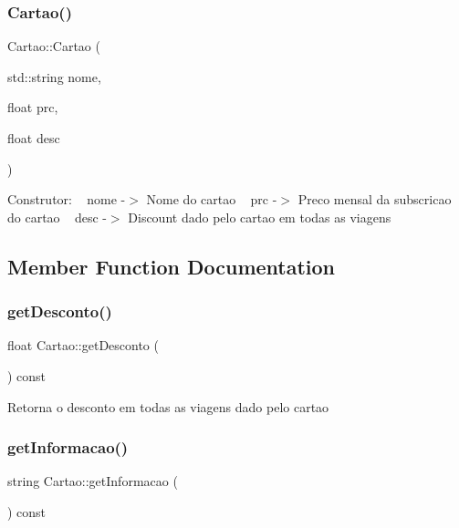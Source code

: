 \subsubsection{\texorpdfstring{Cartao()}{Cartao()}}
{\footnotesize\ttfamily Cartao\+::\+Cartao (\begin{DoxyParamCaption}\item[{std\+::string}]{nome,  }\item[{float}]{prc,  }\item[{float}]{desc }\end{DoxyParamCaption})}

Construtor\+: ~\newline
nome -\/$>$ Nome do cartao ~\newline
prc -\/$>$ Preco mensal da subscricao do cartao ~\newline
desc -\/$>$ Discount dado pelo cartao em todas as viagens ~\newline


\subsection{Member Function Documentation}
\mbox{\label{class_cartao_a853d214e1f98f1f49c364b75942ab1c4}} 
\subsubsection{\texorpdfstring{get\+Desconto()}{getDesconto()}}
{\footnotesize\ttfamily float Cartao\+::get\+Desconto (\begin{DoxyParamCaption}{ }\end{DoxyParamCaption}) const}

Retorna o desconto em todas as viagens dado pelo cartao \mbox{\label{class_cartao_a53a61ff5e28d5c7020fd84268dcddfb6}} 
\subsubsection{\texorpdfstring{get\+Informacao()}{getInformacao()}}
{\footnotesize\ttfamily string Cartao\+::get\+Informacao (\begin{DoxyParamCaption}{ }\end{DoxyParamCaption}) const}

